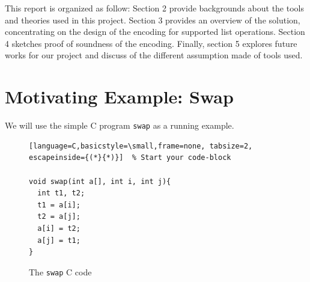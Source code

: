 \documentclass[onecolumn, preprint]{sigplanconf}
\begin{document}
This report is organized as follow: Section 2 provide backgrounds about the tools and theories used in this project. Section 3 provides an overview of the solution, concentrating on the design of the encoding for supported list operations. Section 4 sketches proof of soundness of the encoding. Finally, section 5 explores future works for our project and discuss of the different assumption made of tools used.

\section{Motivating Example: Swap}
\label{sec:motiv}

We will use the simple C program \lstinline|swap| as a running example.

\begin{figure}
\begin{lstlisting}[language=C,basicstyle=\small,frame=none, tabsize=2, escapeinside={(*}{*)}]  % Start your code-block

void swap(int a[], int i, int j){
  int t1, t2;
  t1 = a[i];
  t2 = a[j];
  a[i] = t2;
  a[j] = t1;
}
\end{lstlisting}
   \label{fig:swap}
   \caption{The \lstinline|swap|  C code}
\end{figure}
\end{document}
